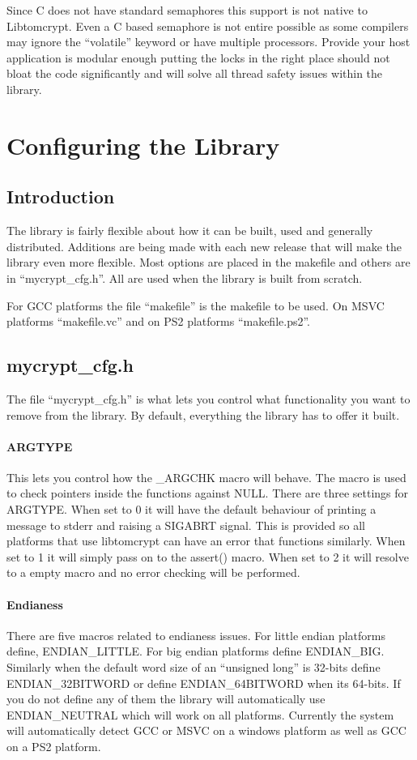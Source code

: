 \documentclass[b5paper]{book}
\begin{document}
Since C does not have standard semaphores this support is not native to Libtomcrypt.  Even a C based semaphore is not entire
possible as some compilers may ignore the ``volatile'' keyword or have multiple processors.  Provide your host application
is modular enough putting the locks in the right place should not bloat the code significantly and will solve all thread
safety issues within the library.

\chapter{Configuring the Library}
\section{Introduction}
The library is fairly flexible about how it can be built, used and generally distributed.  Additions are being made with
each new release that will make the library even more flexible.  Most options are placed in the makefile and others
are in ``mycrypt\_cfg.h''.  All are used when the library is built from scratch.

For GCC platforms the file ``makefile'' is the makefile to be used.  On MSVC platforms ``makefile.vc'' and on PS2 platforms
``makefile.ps2''.

\section{mycrypt\_cfg.h}
The file ``mycrypt\_cfg.h'' is what lets you control what functionality you want to remove from the library.  By default,
everything the library has to offer it built.  

\subsubsection{ARGTYPE}
This lets you control how the \_ARGCHK macro will behave.  The macro is used to check pointers inside the functions against
NULL.  There are three settings for ARGTYPE.  When set to 0 it will have the default behaviour of printing a message to 
stderr and raising a SIGABRT signal.  This is provided so all platforms that use libtomcrypt can have an error that functions
similarly.  When set to 1 it will simply pass on to the assert() macro.  When set to 2 it will resolve to a empty macro
and no error checking will be performed.

\subsubsection{Endianess}
There are five macros related to endianess issues.  For little endian platforms define, ENDIAN\_LITTLE.  For big endian
platforms define ENDIAN\_BIG.  Similarly when the default word size of an ``unsigned long'' is 32-bits define ENDIAN\_32BITWORD
or define ENDIAN\_64BITWORD when its 64-bits.  If you do not define any of them the library will automatically use ENDIAN\_NEUTRAL
which will work on all platforms.  Currently the system will automatically detect GCC or MSVC on a windows platform as well
as GCC on a PS2 platform.
\end{document}

